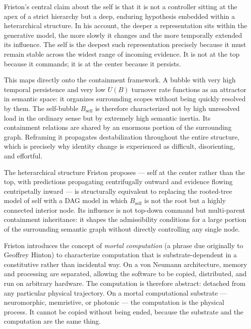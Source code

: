\documentclass[12pt, a4paper]{article}
\theoremstyle{plain}
\theoremstyle{definition}
\theoremstyle{remark}
\begin{document}
Friston's central claim about the self is that it is not a controller sitting
at the apex of a strict hierarchy but a deep, enduring hypothesis embedded
within a heterarchical structure. In his account, the deeper a representation
sits within the generative model, the more slowly it changes and the more
temporally extended its influence. The self is the deepest such representation
precisely because it must remain stable across the widest range of incoming
evidence. It is not at the top because it commands; it is at the center
because it persists.

This maps directly onto the containment framework. A bubble with very high
temporal persistence and very low $U(B)$ turnover rate functions as an
attractor in semantic space: it organizes surrounding scopes without being
quickly resolved by them. The self-bubble $B_{\text{self}}$ is therefore
characterized not by high unresolved load in the ordinary sense but by
extremely high semantic inertia. Its containment relations are shared by an
enormous portion of the surrounding graph. Reframing it propagates
destabilization throughout the entire structure, which is precisely why
identity change is experienced as difficult, disorienting, and effortful.

The heterarchical structure Friston proposes — self at the center rather than
the top, with predictions propagating centrifugally outward and evidence
flowing centripetally inward — is structurally equivalent to replacing the
rooted-tree model of self with a DAG model in which $B_{\text{self}}$ is not
the root but a highly connected interior node. Its influence is not top-down
command but multi-parent containment inheritance: it shapes the admissibility
conditions for a large portion of the surrounding semantic graph without
directly controlling any single node.

Friston introduces the concept of \emph{mortal computation} (a phrase due
originally to Geoffrey Hinton) to characterize computation that is
substrate-dependent in a constitutive rather than incidental way. On a von
Neumann architecture, memory and processing are separated, allowing the
software to be copied, distributed, and run on arbitrary hardware. The
computation is therefore abstract: detached from any particular physical
trajectory. On a mortal computational substrate — neuromorphic, memristive,
or photonic — the computation is the physical process. It cannot be copied
without being ended, because the substrate and the computation are the same
thing.
\end{document}
